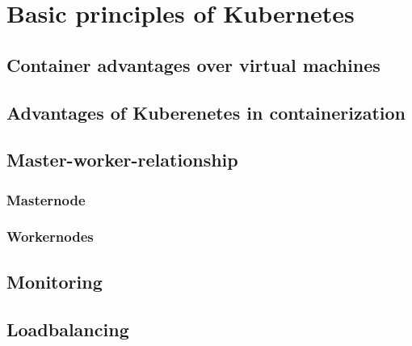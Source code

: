 \chapter{Basic principles of Kubernetes}
\section{Container advantages over virtual machines}
\section{Advantages of Kuberenetes in containerization}
\section{Master-worker-relationship}
\subsection{Masternode}
\subsection{Workernodes}
\section{Monitoring}
\section{Loadbalancing}